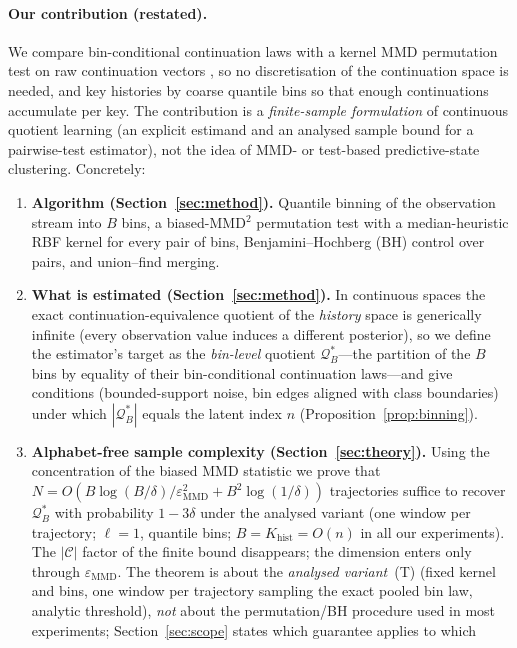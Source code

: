 \documentclass[10pt]{article}
\newcommand{\calC}{\mathcal{C}}
\newcommand{\epsMMD}{\varepsilon_{\mathrm{MMD}}}
\newcommand{\Qstar}{\mathcal{Q}^*}
\newcommand{\Khist}{K_{\mathrm{hist}}}
\begin{document}
\paragraph{Our contribution (restated).}
We compare bin-conditional continuation laws with a kernel MMD permutation test
on raw continuation vectors \citep{Gretton2012}, so no discretisation of the
continuation space is needed, and key histories by coarse quantile bins so that
enough continuations accumulate per key.  The contribution is a
\emph{finite-sample formulation} of continuous quotient learning (an explicit
estimand and an analysed sample bound for a pairwise-test estimator), not the
idea of MMD- or test-based predictive-state clustering.  Concretely:
\begin{enumerate}
\item \textbf{Algorithm (Section~\ref{sec:method}).}  Quantile binning of the
  observation stream into $B$ bins, a biased-MMD$^2$ permutation test with a
  median-heuristic RBF kernel for every pair of bins, Benjamini--Hochberg (BH)
  control over pairs, and union--find merging.
\item \textbf{What is estimated (Section~\ref{sec:method}).}  In continuous
  spaces the exact continuation-equivalence quotient of the \emph{history}
  space is generically infinite (every observation value induces a different
  posterior), so we define the estimator's target as the \emph{bin-level}
  quotient $\Qstar_B$---the partition of the $B$ bins by equality of their
  bin-conditional continuation laws---and give conditions (bounded-support
  noise, bin edges aligned with class boundaries) under which
  $|\Qstar_B|$ equals the latent index $n$
  (Proposition~\ref{prop:binning}).
\item \textbf{Alphabet-free sample complexity (Section~\ref{sec:theory}).}
  Using the concentration of the biased MMD statistic
  \citep[Thm.~7, Cor.~9]{Gretton2012} we prove that
  $N=O(B\log(B/\delta)/\epsMMD^2+B^2\log(1/\delta))$ trajectories suffice
  to recover $\Qstar_B$ with probability $1-3\delta$ under the analysed
  variant (one window per trajectory; $\ell=1$, quantile bins; $B=\Khist=O(n)$
  in all our experiments).  The $|\calC|$ factor of the finite bound disappears; the
  dimension enters only through $\epsMMD$.  The theorem is about the
  \emph{analysed variant}~(T) (fixed kernel and bins, one window per trajectory sampling
  the exact pooled bin law, analytic threshold), \emph{not} about the permutation/BH procedure used in most
  experiments; Section~\ref{sec:scope} states which guarantee applies to which

\end{enumerate}
\end{document}

